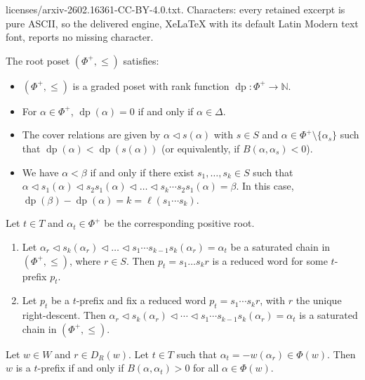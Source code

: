 \documentclass[10pt,a4paper]{amsart}
\newcommand{\dep}{\operatorname{dp}}
\begin{document}
licenses/arxiv-2602.16361-CC-BY-4.0.txt. Characters: every retained excerpt is pure ASCII, so the delivered engine, XeLaTeX with its default Latin Modern text font, reports no missing character.
\begin{Proposition}\label{prop:BasicDepth} The root poset $(\Phi^+,\leq)$ satisfies:
    \begin{itemize}
        \item[(i)] $(\Phi^+,\leq)$ is a graded poset with rank function $\dep: \Phi^+\rightarrow \mathbb{N}$.
        \item[(ii)] For $\alpha\in\Phi^+$, $\dep(\alpha)=0$ if and only if $\alpha\in\Delta$.
        \item[(iii)] The cover relations are given by $\alpha \lhd s(\alpha)$ with $s\in S$ and $\alpha \in \Phi^+\setminus \{\alpha_s\}$ such that $\dep(\alpha)<\dep(s(\alpha))$ (or equivalently, if $B(\alpha,\alpha_s)<0$). 
        \item[(iv)] We have $\alpha<\beta$ if and only if there exist $s_1,\ldots, s_k\in S$ such that $\alpha \lhd s_1(\alpha)\lhd s_2s_1(\alpha)\lhd \ldots \lhd s_k\cdots s_2s_1(\alpha)=\beta$. In this case, $\dep(\beta)-\dep(\alpha)=k=\ell(s_1\cdots s_k)$. 
    \end{itemize}
\end{Proposition}

\begin{Proposition}\label{prop:PrefRoot} Let $t\in T$ and $\alpha_t\in \Phi^+$ be the corresponding positive root. 
\begin{enumerate}
\item Let  $\alpha_{r}\lhd s_k(\alpha_{r})\lhd\dots\lhd s_1\cdots s_{k-1} s_k(\alpha_r)=\alpha_t$ be a saturated chain in $(\Phi^+,\leq)$, where $r\in S$. Then $p_t=s_1\dots s_kr$ is a reduced word for some $t$-prefix $p_t$. 

\item Let $p_t$ be a  $t$-prefix and fix a reduced word $p_t=s_1\cdots s_k r $, with $r$ the unique right-descent. Then $\alpha_{r}\lhd s_k(\alpha_{r})\lhd\cdots\lhd s_1\cdots s_{k-1} s_k(\alpha_r)=\alpha_t$ is a saturated chain in $(\Phi^+,\leq)$.
\end{enumerate}
\end{Proposition}

\begin{Theorem}\label{thm:Pref1}  Let $w\in W$ and $r\in D_R(w)$. Let $t\in T$ such that $\alpha_t=-w(\alpha_r)\in \Phi(w)$. Then $w$ is a $t$-prefix if and only if $B(\alpha,\alpha_t)>0$ for all $\alpha\in \Phi(w)$. 
\end{Theorem}
\end{document}
